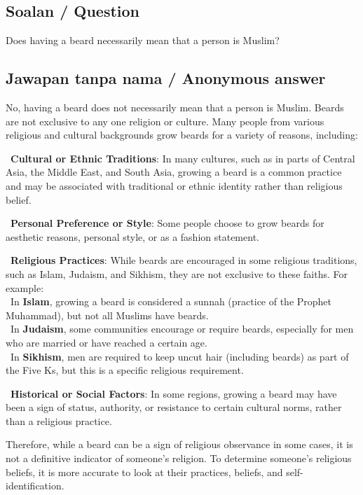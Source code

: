 \documentclass[11pt,a4paper]{article}
\begin{document}
\subsection*{Soalan / Question}
Does having a beard necessarily mean that a person is Muslim?

\subsection*{Jawapan tanpa nama / Anonymous answer}
No, having a beard does not necessarily mean that a person is Muslim. Beards are not exclusive to any one religion or culture. Many people from various religious and cultural backgrounds grow beards for a variety of reasons, including:\par\medskip \textbullet\ \textbf{Cultural or Ethnic Traditions}: In many cultures, such as in parts of Central Asia, the Middle East, and South Asia, growing a beard is a common practice and may be associated with traditional or ethnic identity rather than religious belief.\par\medskip \textbullet\ \textbf{Personal Preference or Style}: Some people choose to grow beards for aesthetic reasons, personal style, or as a fashion statement.\par\medskip \textbullet\ \textbf{Religious Practices}: While beards are encouraged in some religious traditions, such as Islam, Judaism, and Sikhism, they are not exclusive to these faiths. For example:\\ \textbullet\ In \textbf{Islam}, growing a beard is considered a sunnah (practice of the Prophet Muhammad), but not all Muslims have beards.\\ \textbullet\ In \textbf{Judaism}, some communities encourage or require beards, especially for men who are married or have reached a certain age.\\ \textbullet\ In \textbf{Sikhism}, men are required to keep uncut hair (including beards) as part of the Five Ks, but this is a specific religious requirement.\par\medskip \textbullet\ \textbf{Historical or Social Factors}: In some regions, growing a beard may have been a sign of status, authority, or resistance to certain cultural norms, rather than a religious practice.\par\medskip Therefore, while a beard can be a sign of religious observance in some cases, it is not a definitive indicator of someone's religion. To determine someone's religious beliefs, it is more accurate to look at their practices, beliefs, and self-identification.
\end{document}
